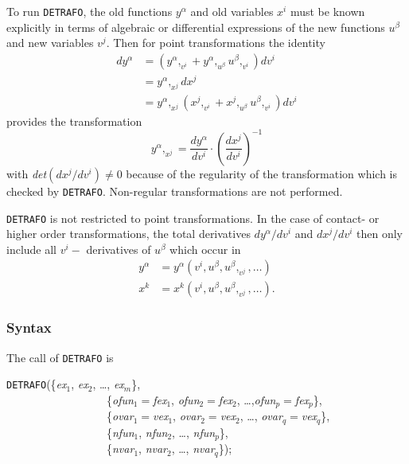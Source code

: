 To run \texttt{DETRAFO}, the old functions $y^{\alpha}$ and old
variables $x^i$ must be
known explicitly in terms of algebraic or
differential expressions of the new functions $u^{\beta}$
and new variables $v^j$. Then for point transformations the identity
\begin{align}
dy^{\alpha} & = \left(y^{\alpha},_{v^i} +
                  y^{\alpha},_{u^{\beta}}u^{\beta},_{v^i}\right) dv^i \\
            & = y^{\alpha},_{x^j}dx^j  \\
            & = y^{\alpha},_{x^j}\left(x^j,_{v^i} +
                  x^j,_{u^{\beta}}u^{\beta},_{v^i}\right) dv^i
\end{align}
provides the transformation
\begin{equation}
y^{\alpha},_{x^j} = \frac{dy^\alpha}{dv^i}\cdot
                    \left(\frac{dx^j}{dv^i}\right)^{-1}   \label{trafo}
\end{equation}
with \textit{det}$\left(dx^j/dv^i\right) \neq 0$ because of the regularity
of the transformation which is checked by \texttt{DETRAFO}. Non-regular
transformations are not performed.

\texttt{DETRAFO} is not restricted to point transformations.
In the case of
contact- or higher order transformations, the total
derivatives $dy^{\alpha}/dv^i$ and $dx^j/dv^i$ then only include all
$v^i-$ derivatives of $u^{\beta}$ which occur in
\begin{align*}
y^{\alpha} &= y^{\alpha}(v^i,u^{\beta},u^{\beta},_{v^j},\ldots) \\
x^k        &= x^k(v^i,u^{\beta},u^{\beta},_{v^j},\ldots).
\end{align*}
\subsubsection{Syntax}
The call of \texttt{DETRAFO} is

\begin{flushleft}
\texttt{DETRAFO}(\{\textit{ex}$_1$, \textit{ex}$_2$, \ldots , \textit{ex}$_m$\}, \\
~~~~~~~~~~~~~~~~~~\{\textit{ofun}$_1=$\textit{fex}$_1$, \textit{ofun}$_2=$\textit{fex}$_2$,
               \ldots ,\textit{ofun}$_p=$\textit{fex}$_p$\}, \\
~~~~~~~~~~~~~~~~~~\{\textit{ovar}$_1=$\textit{vex}$_1$, \textit{ovar}$_2=$\textit{vex}$_2$, \ldots ,
                  \textit{ovar}$_q=$\textit{vex}$_q$\}, \\
~~~~~~~~~~~~~~~~~~\{\textit{nfun}$_1$, \textit{nfun}$_2$, \ldots , \textit{nfun}$_p$\},\\
~~~~~~~~~~~~~~~~~~\{\textit{nvar}$_1$, \textit{nvar}$_2$, \ldots , \textit{nvar}$_q$\});
\end{flushleft}

